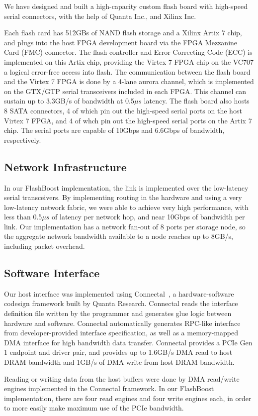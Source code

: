 
We have designed and built a high-capacity custom flash board with high-speed
serial connectors, with the help of Quanta Inc., and Xilinx Inc.

Each flash card has 512GBs of NAND flash storage and a Xilinx Artix 7 chip, and
plugs into the host FPGA development board via the FPGA Mezzanine Card (FMC)
connector. The flash controller and Error Correcting Code (ECC) is implemented
on this Artix chip, providing the Virtex 7 FPGA chip on the VC707 a logical
error-free access into flash. The communication between the flash board and the
Virtex 7 FPGA is done by a 4-lane aurora channel, which is implemented on the
GTX/GTP serial transceivers included in each FPGA. This channel can sustain up
to 3.3GB/s of bandwidth at 0.5$\mu s$ latency.
The flash board also hosts 8 SATA connectors, 4 of
which pin out the high-speed serial ports on the host Virtex 7 FPGA,
and 4 of whch pin out the high-speed serial ports on the Artix 7 chip.
The serial ports are capable of 10Gbps and 6.6Gbps of bandwidth, respectively.

\subsection{Network Infrastructure}

In our FlashBoost implementation, the link is implemented over the
low-latency serial transceivers.  By
implementing routing in the hardware and using a very low-latency network
fabric, we were able to achieve very high performance, with less than 0.5$\mu s$ of
latency per network hop, and near 10Gbps of bandwidth per link. Our
implementation has a network fan-out of 8 ports per storage node, so the
aggregate network bandwidth available to a node reaches up to 8GB/s, including
packet overhead.

\subsection{Software Interface}

Our host interface was implemented using Connectal~\cite{connectal}, a
hardware-software codesign framework built by Quanta Research.
Connectal reads the interface definition file written by the programmer and
generates glue logic between hardware and software. Connectal automatically
generates RPC-like interface from developer-provided interface specification, as
well as a memory-mapped DMA interface for high bandwidth data transfer.
Connectal provides a PCIe Gen 1 endpoint and driver pair, and provides up to
1.6GB/s DMA read to host DRAM bandwidth and 1GB/s of DMA write from host DRAM
bandwidth. 

Reading or writing data from the host buffers were done by DMA read/write
engines implemented in the Connectal framework. In our FlashBoost
implementation, there are four read engines and four write engines each, in
order to more easily make maximum use of the PCIe bandwidth. 



